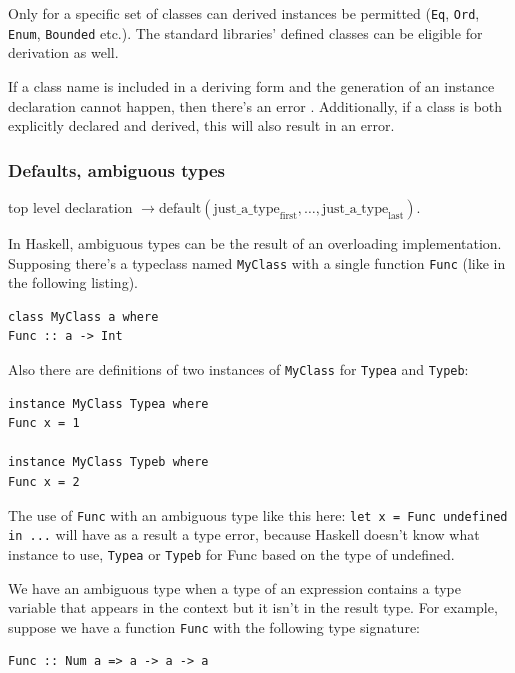 \documentclass[a4paper, titlepage, twoside]{article}
\begin{document}
Only for a specific set of classes can derived instances be permitted (\texttt{Eq}, \texttt{Ord}, \texttt{Enum}, \texttt{Bounded} etc.). The standard libraries’ defined classes can be eligible for derivation as well.

If a class name is included in a deriving form and the generation of an instance declaration cannot happen, then there’s an error \autocite{marlowHaskell2010Language2010}. Additionally, if a class is both explicitly declared and derived, this will also result in an error.

\subsubsection{Defaults, ambiguous types}
\label{sec:org5389956}

top level declaration \(\rightarrow \text{default} (\text{just}\_\text{a}\_\text{type}_{\text{first}}, \dots, \text{just}\_\text{a}\_\text{type}_{\text{last}})\).

In Haskell, ambiguous types can be the result of an overloading implementation. Supposing there’s a
typeclass named \texttt{MyClass} with a single function \texttt{Func} (like in the following listing).

\begin{verbatim}
class MyClass a where
Func :: a -> Int
\end{verbatim}

Also there are definitions of two instances of \texttt{MyClass} for \texttt{Typea} and \texttt{Typeb}:

\begin{verbatim}
instance MyClass Typea where
Func x = 1

instance MyClass Typeb where
Func x = 2  
\end{verbatim}

The use of \texttt{Func} with an ambiguous type like this here: \texttt{let x = Func undefined in ...} will have as a result a type error, because Haskell doesn't know what instance to use, \texttt{Typea} or \texttt{Typeb} for Func based on the type of undefined.

We have an ambiguous type when a type of an expression contains a type variable that appears in the
context but it isn't in the result type. For example, suppose we have a function \texttt{Func} with the following type signature:

\begin{verbatim}
Func :: Num a => a -> a -> a
\end{verbatim}
\end{document}
